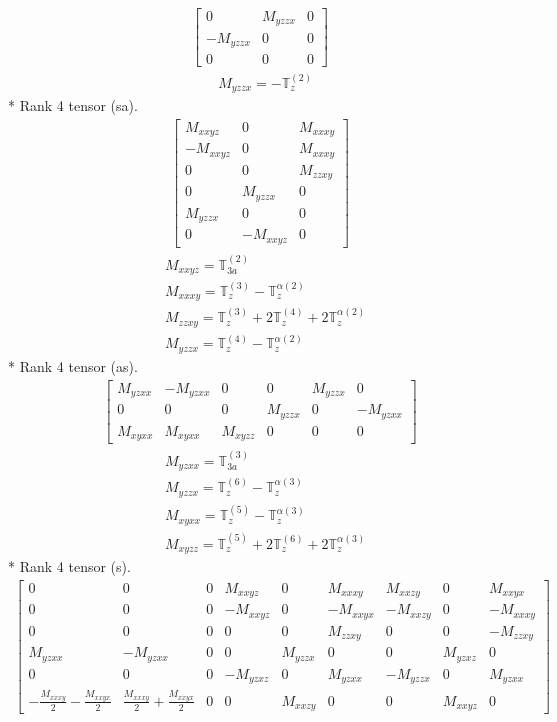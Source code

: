 \documentclass[fleqn,8pt,landscape]{jsarticle}
\begin{document}
\begin{align*}
\begin{bmatrix} 0 & M_{yzzx} & 0 \\ - M_{yzzx} & 0 & 0 \\ 0 & 0 & 0 \end{bmatrix}
\end{align*}
\begin{align*}
& M_{yzzx} = - \mathbb{T}_{z}^{(2)}
\end{align*}
* Rank 4 tensor (sa).
\begin{align*}
\begin{bmatrix} M_{xxyz} & 0 & M_{xxxy} \\ - M_{xxyz} & 0 & M_{xxxy} \\ 0 & 0 & M_{zzxy} \\ 0 & M_{yzzx} & 0 \\ M_{yzzx} & 0 & 0 \\ 0 & - M_{xxyz} & 0 \end{bmatrix}
\end{align*}
\begin{align*}
& M_{xxyz} = \mathbb{T}_{3a}^{(2)} \\
& M_{xxxy} = \mathbb{T}_{z}^{(3)} - \mathbb{T}_{z}^{\alpha(2)} \\
& M_{zzxy} = \mathbb{T}_{z}^{(3)} + 2 \mathbb{T}_{z}^{(4)} + 2 \mathbb{T}_{z}^{\alpha(2)} \\
& M_{yzzx} = \mathbb{T}_{z}^{(4)} - \mathbb{T}_{z}^{\alpha(2)}
\end{align*}
* Rank 4 tensor (as).
\begin{align*}
\begin{bmatrix} M_{yzxx} & - M_{yzxx} & 0 & 0 & M_{yzzx} & 0 \\ 0 & 0 & 0 & M_{yzzx} & 0 & - M_{yzxx} \\ M_{xyxx} & M_{xyxx} & M_{xyzz} & 0 & 0 & 0 \end{bmatrix}
\end{align*}
\begin{align*}
& M_{yzxx} = \mathbb{T}_{3a}^{(3)} \\
& M_{yzzx} = \mathbb{T}_{z}^{(6)} - \mathbb{T}_{z}^{\alpha(3)} \\
& M_{xyxx} = \mathbb{T}_{z}^{(5)} - \mathbb{T}_{z}^{\alpha(3)} \\
& M_{xyzz} = \mathbb{T}_{z}^{(5)} + 2 \mathbb{T}_{z}^{(6)} + 2 \mathbb{T}_{z}^{\alpha(3)}
\end{align*}
* Rank 4 tensor (s).
\begin{align*}
\begin{bmatrix} 0 & 0 & 0 & M_{xxyz} & 0 & M_{xxxy} & M_{xxzy} & 0 & M_{xxyx} \\ 0 & 0 & 0 & - M_{xxyz} & 0 & - M_{xxyx} & - M_{xxzy} & 0 & - M_{xxxy} \\ 0 & 0 & 0 & 0 & 0 & M_{zzxy} & 0 & 0 & - M_{zzxy} \\ M_{yzxx} & - M_{yzxx} & 0 & 0 & M_{yzzx} & 0 & 0 & M_{yzxz} & 0 \\ 0 & 0 & 0 & - M_{yzxz} & 0 & M_{yzxx} & - M_{yzzx} & 0 & M_{yzxx} \\ - \frac{M_{xxxy}}{2} - \frac{M_{xxyx}}{2} & \frac{M_{xxxy}}{2} + \frac{M_{xxyx}}{2} & 0 & 0 & M_{xxzy} & 0 & 0 & M_{xxyz} & 0 \end{bmatrix}
\end{align*}
\end{document}
